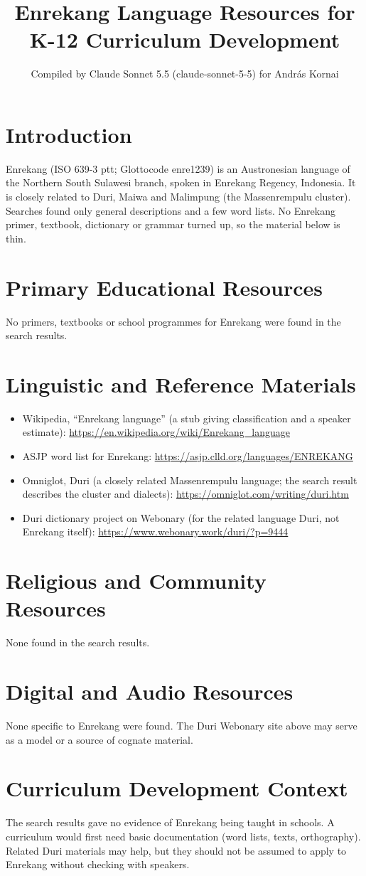 \documentclass[12pt]{article}
\title{Enrekang Language Resources for K-12 Curriculum Development}
\author{Compiled by Claude Sonnet 5.5 (claude-sonnet-5-5) for Andr\'as Kornai}
\date{}
\begin{document}
\maketitle

\section{Introduction}
Enrekang (ISO 639-3 ptt; Glottocode enre1239) is an Austronesian language of the Northern South Sulawesi branch, spoken in Enrekang Regency, Indonesia. It is closely related to Duri, Maiwa and Malimpung (the Massenrempulu cluster). Searches found only general descriptions and a few word lists. No Enrekang primer, textbook, dictionary or grammar turned up, so the material below is thin.

\section{Primary Educational Resources}
No primers, textbooks or school programmes for Enrekang were found in the search results.

\section{Linguistic and Reference Materials}
\begin{itemize}
\item Wikipedia, ``Enrekang language'' (a stub giving classification and a speaker estimate): \url{https://en.wikipedia.org/wiki/Enrekang_language}
\item ASJP word list for Enrekang: \url{https://asjp.clld.org/languages/ENREKANG}
\item Omniglot, Duri (a closely related Massenrempulu language; the search result describes the cluster and dialects): \url{https://omniglot.com/writing/duri.htm}
\item Duri dictionary project on Webonary (for the related language Duri, not Enrekang itself): \url{https://www.webonary.work/duri/?p=9444}
\end{itemize}

\section{Religious and Community Resources}
None found in the search results.

\section{Digital and Audio Resources}
None specific to Enrekang were found. The Duri Webonary site above may serve as a model or a source of cognate material.

\section{Curriculum Development Context}
The search results gave no evidence of Enrekang being taught in schools. A curriculum would first need basic documentation (word lists, texts, orthography). Related Duri materials may help, but they should not be assumed to apply to Enrekang without checking with speakers.
\end{document}

